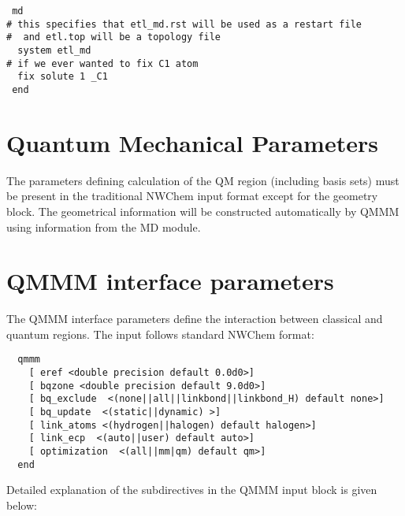 \begin{verbatim}
 md
# this specifies that etl_md.rst will be used as a restart file
#  and etl.top will be a topology file
  system etl_md
# if we ever wanted to fix C1 atom 
  fix solute 1 _C1
 end
\end{verbatim}


\section{Quantum Mechanical Parameters}
 
The parameters defining calculation of the QM region (including basis sets) 
must be present in the traditional NWChem input format
except for the geometry block. The geometrical information will
be constructed automatically by QMMM using information from the MD module.  

\section{QMMM interface parameters}

The QMMM interface parameters define the interaction between classical and quantum regions.
The  input follows standard NWChem format:
\begin{verbatim}
  qmmm
    [ eref <double precision default 0.0d0>]
    [ bqzone <double precision default 9.0d0>]
    [ bq_exclude  <(none||all||linkbond||linkbond_H) default none>]
    [ bq_update  <(static||dynamic) >]
    [ link_atoms <(hydrogen||halogen) default halogen>]
    [ link_ecp  <(auto||user) default auto>]
    [ optimization  <(all||mm|qm) default qm>]
  end
\end{verbatim}

Detailed explanation of the subdirectives in the QMMM input block is given below:

